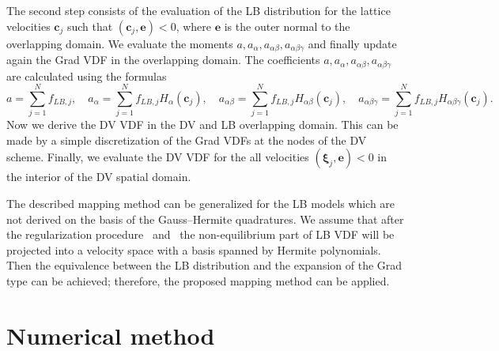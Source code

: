 \documentclass{elsarticle} %
\newcommand{\Set}[2]{\{\,{#1}:{#2}\,\}}
\newcommand{\bxi}{\boldsymbol{\xi}}
\newcommand{\bc}{\boldsymbol{c}}
\newcommand{\ai}{a_{\alpha}}
\newcommand{\aij}{a_{\alpha\beta}}
\newcommand{\aijk}{a_{\alpha\beta\gamma}}
\newcommand{\Hi}{H_{\alpha}}
\newcommand{\Hij}{H_{\alpha\beta}}
\newcommand{\Hijk}{H_{\alpha\beta\gamma}}
\begin{document}
The second step consists of the evaluation of the LB   distribution for the lattice velocities $\bc_j$ such that $(\bc_j,\mathbf{e})<0$, where $\mathbf{e}$ is the outer normal to the overlapping domain.
We evaluate the moments $a,\ai,\aij,
\aijk$ and finally update again the Grad VDF in the overlapping domain.
The coefficients $a,\ai,\aij, \aijk$ are calculated using the formulas
\begin{equation}
a=\sum_{j=1}^N f_{LB,j}, \quad \ai=\sum_{j=1}^N f_{LB,j}\Hi(\bc_j), \quad \aij=\sum_{j=1}^N f_{LB,j}\Hij(\bc_j),
\quad \aijk=\sum_{j=1}^N f_{LB,j}\Hijk(\bc_j).
\end{equation}
Now we  derive the DV VDF in the DV and LB overlapping domain. This can be made by a simple
discretization of the Grad VDFs at the nodes of the DV scheme.
Finally, we evaluate the DV VDF for the all velocities $(\bxi_j,\mathbf{e}) <0$
in the interior of the DV spatial domain.

The described mapping method can be generalized for the LB models which are not derived on the basis of the Gauss--Hermite quadratures.
We assume that after the regularization procedure~\cite{Latt2006, Chen2006} and~\cite{Zhang2006, Mont2015, Mattila2017}
the non-equilibrium part of LB VDF will be projected into a velocity space with a basis spanned by Hermite polynomials.
Then the equivalence between the LB distribution and the expansion of the Grad type can be achieved;
therefore, the proposed mapping method can be applied.

\section{Numerical method}\label{sec:numerics}


\end{document}
